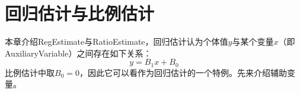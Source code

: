 \chapter{回归估计与比例估计}

本章介绍\gls{RegEstimate}与\gls{RatioEstimate}，回归估计认为个体值$y$与某个变量$x$（即\gls{AuxiliaryVariable}）之间存在如下关系：
\begin{equation*}
	y=B_1x+B_0
\end{equation*}
比例估计中取$B_0=0$，因此它可以看作为回归估计的一个特例。先来介绍辅助变量。












